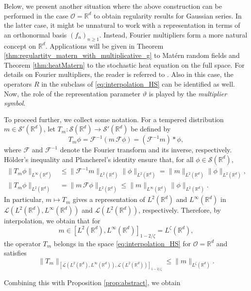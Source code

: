 \documentclass[reqno]{amsart}
\theoremstyle{plain}
\theoremstyle{remark}
\theoremstyle{plain}
\numberwithin{equation}{section}
\newcommand\calL{\mathcal{L}}
\newcommand\cO{\mathcal{O}}
\def\R{{\mathbb R}}
\newcommand{\F}{{\mathscr F}}
\newcommand{\1}{\one}
\renewcommand{\S}{\mathcal{S}}
\begin{document}
\smallskip

Below, we present another situation where the above construction can be performed in the case $\cO = \R^d$ to obtain regularity results for Gaussian series. In the latter case, it might be unnatural to work with a representation in terms of an orthonormal basis $(f_n)_{n\geq 1}$. Instead, Fourier multipliers form a more natural concept on $\R^d$. Applications will be given in Theorem \ref{thm:regulartity_matern_with_multiplicative_g} 
to  Mat\'ern random fields and  Theorem \ref{thm:heatMatern} to the stochastic heat equation on the full space. 
For details on Fourier multipliers, the reader is referred to \cite{Grafakos1, Horm60}. 
Also in this case, the operators $R$ in the subclass of \eqref{eq:interpolation_HS} can be identified as well. Now, the role of the representation parameter $\vartheta$ is played by the \emph{multiplier symbol}. 

To proceed further, we collect some notation. For a tempered distribution $m\in \S'(\R^d)$, let $T_m:\S(\R^d)\to \S'(\R^d)$ be defined by 
\begin{equation}
\label{eq:Fourier_multiplier}
T_m \phi= \F^{-1} (m \,\F\phi) =  (\F^{-1}{m})*\phi,
\end{equation}
where $\F$ and $\F^{-1}$ denote the Fourier transform and its inverse, respectively.
H\"older's inequality and Plancherel's identity ensure that, for all $\phi\in \S(\R^d)$,
\begin{align*}
\|T_m\phi\|_{L^\infty(\R^d)} &\leq \|\F^{-1}m\|_{L^2(\R^d)} \|\phi\|_{L^2(\R^d)} = \|m\|_{L^2(\R^d)} \|\phi\|_{L^2(\R^d)},
\\  \|T_m\phi\|_{L^2(\R^d)} &= \|m\, \F\phi\|_{L^2(\R^d)} \leq \|m\|_{L^\infty(\R^d)} \|\phi\|_{L^2(\R^d)}.
\end{align*}
In particular, $m\mapsto T_m$ gives a representation of $L^2(\R^d)$ and $L^\infty(\R^d)$ in $\calL(L^2(\R^d),L^\infty(\R^d))$ and $\calL(L^2(\R^d))$, respectively. 
Therefore, by interpolation, we obtain that for 
$$
m\in [L^2(\R^d),L^\infty(\R^d)]_{1 - 2/\zeta} = L^{\zeta}(\R^d),
$$ 
the operator
$T_m$ belongs in the space \eqref{eq:interpolation_HS} for $\cO = \R^d$ and satisfies 
\[\|T_m\|_{[\calL(L^2(\R^d), L^\infty(\R^d)), \calL(L^2(\R^d))]_{1 - 2/\zeta}}  \leq \|m\|_{L^{\zeta}(\R^d)}.  \]

Combining this with Proposition \ref{prop:abstract}, we obtain
 
\end{document}
